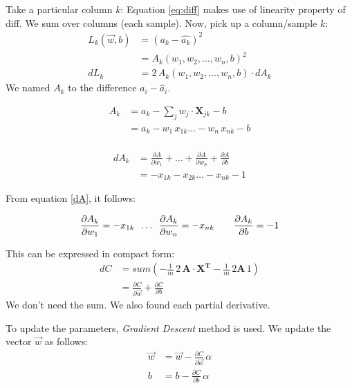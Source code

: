 Take a particular column $k$:
Equation \ref{eq:diff} makes use of linearity property of diff. We sum over columns (each sample). Now, pick up a column/sample $k$:
\begin{align*}
  L_k(\vec{w},b) &= (a_k - \hat{a_k})^2\\
    &= A_k(w_1, w_2,\ldots, w_n, b)^2\\
  dL_k &= 2\,A_k(w_1,w_2,\ldots, w_n, b)\cdot{}dA_k
\end{align*}
We named $A_k$ to the difference $a_i-\hat{a}_i$.

\begin{align*}
  A_k  &= a_k - \sum_j w_j\cdot{}\mathbf{X}_{jk} - b \\
  &= a_k - w_1\,x_{1k} \ldots{}-w_n\,x_{nk} - b \\
\end{align*}

\begin{align}
  dA_k &= \frac{\partial A}{\partial w_1}+ \ldots + \frac{\partial A}{\partial w_n}+ \frac{\partial A}{\partial b} \nonumber\\
  &=  -x_{1k} -x_{2k} \ldots - x_{nk} -1 \label{dA}
\end{align}

From equation \ref{dA}, it follows:

\begin{center}
\begin{align*}
  \frac{\partial A_{k}}{\partial w_1} = -x_{1k} \hspace{0.5em} \ldots \hspace{0.5em}\frac{\partial A_{k}}{\partial w_n}= -x_{nk}\hspace{2em} \frac{\partial A_k}{\partial b} = -1
\end{align*} 
\end{center}

This can be expressed in compact form:
\begin{align}
  dC &= sum(-\frac{1}{m}\,{}2\,\mathbf{A}\cdot{}\mathbf{X^T} -\frac{1}{m}\,{}2\mathbf{A}\,{}1)\\
  &= \frac{\partial C}{\partial \vec{w}} + \frac{\partial C}{\partial b}  \nonumber
\end{align}
We don't need the sum. We also found each partial derivative.

To update the parameters, \textit{Gradient Descent} method is used. We update the vector $\vec{w}$ as follows:
\begin{align}
  \vec{w} &= \vec{w} -\frac{\partial C}{\partial \vec{w}}\,\alpha\label{eq:wlin}\\
  b &= b -\frac{\partial C}{\partial b}\,{}\alpha
\end{align}

